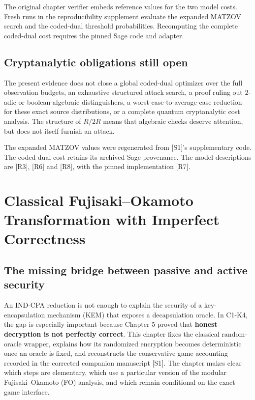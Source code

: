 \documentclass[
  11pt,
  a4paper,
  oneside]{report}
\begin{document}
The original chapter verifier embeds reference values for the two model
costs. Fresh runs in the reproducibility supplement evaluate the
expanded MATZOV search and the coded-dual threshold probabilities.
Recomputing the complete coded-dual cost requires the pinned Sage code
and adapter.

\section{Cryptanalytic obligations still
open}\label{cryptanalytic-obligations-still-open}

The present evidence does not close a global coded-dual optimizer over
the full observation budgets, an exhaustive structured attack search, a
proof ruling out \(2\)-adic or boolean-algebraic distinguishers, a
worst-case-to-average-case reduction for these exact source
distributions, or a complete quantum cryptanalytic cost analysis. The
structure of \(R/2R\) means that algebraic checks deserve attention, but
does not itself furnish an attack.

The expanded MATZOV values were regenerated from {[}S1{]}'s
supplementary code. The coded-dual cost retains its archived Sage
provenance. The model descriptions are {[}R3{]}, {[}R6{]} and {[}R8{]},
with the pinned implementation {[}R7{]}.

\chapter{Classical Fujisaki--Okamoto Transformation with Imperfect
Correctness}\label{classical-fujisakiokamoto-transformation-with-imperfect-correctness}

\section{The missing bridge between passive and active
security}\label{the-missing-bridge-between-passive-and-active-security}

An IND-CPA reduction is not enough to explain the security of a
key-encapsulation mechanism (KEM) that exposes a decapsulation oracle.
In C1-K4, the gap is especially important because Chapter 5 proved that
\textbf{honest decryption is not perfectly correct}. This chapter fixes
the classical random-oracle wrapper, explains how its randomized
encryption becomes deterministic once an oracle is fixed, and
reconstructs the conservative game accounting recorded in the corrected
companion manuscript {[}S1{]}. The chapter makes clear which steps are
elementary, which use a particular version of the modular
Fujisaki--Okamoto (FO) analysis, and which remain conditional on the
exact game interface.
\end{document}
